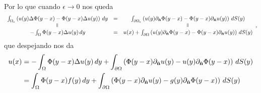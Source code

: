 \documentclass[../edp.tex]{subfiles}
\begin{document}
Por lo que cuando \(\epsilon \to 0\) nos queda
\begin{displaymath}
\begin{array}{ccc}
	\int_{\Omega_{\epsilon}}
	\left(
		u(y) \Delta \Phi(y-x) 
		-
		\Phi(y-x) \Delta u(y)
	\right) \, dy
	&=&
	\int_{\partial\Omega_{\epsilon}}
	\left(
		u(y) \partial_{\n} \Phi(y-x)
		-
		\Phi(y-x) \partial_{\n} u(y)
	\right) \, dS(y)
	\\
	\rotatebox{90}{=}
	&&\rotatebox{90}{=}
	\\
	-
	\int_{\Omega}
		\Phi(y-x) \Delta u(y) \, dy
	&=&
	u(x)
	+
	\int_{\partial\Omega}
	\left(
		u(y) \partial_{\n} \Phi(y-x)
		-
		\Phi(y-x) \partial_{\n} u(y)
	\right) \, dS(y)
\end{array},
\end{displaymath}
que despejando nos da 
\begin{align*}
	u(x)
	&=
	-
	\int_{\Omega}
		\Phi(y-x) \Delta u(y) \, dy
	+
	\int_{\partial\Omega}
	\left(
		\Phi(y-x) \partial_{\hat{\textbf{n}}} u(y)
		-
		u(y) \partial_{\hat{\textbf{n}}} \Phi(y-x)
	\right) \, dS(y)
	\\&=
	\int_{\Omega}
		\Phi(y-x) f(y)\, dy
	+
	\int_{\partial\Omega}
	\left(
		\Phi(y-x) \partial_{\hat{\textbf{n}}} u(y)
		-
		g(y) \partial_{\hat{\textbf{n}}} \Phi(y-x)
	\right) \, dS(y)
\end{align*}
\end{document}
